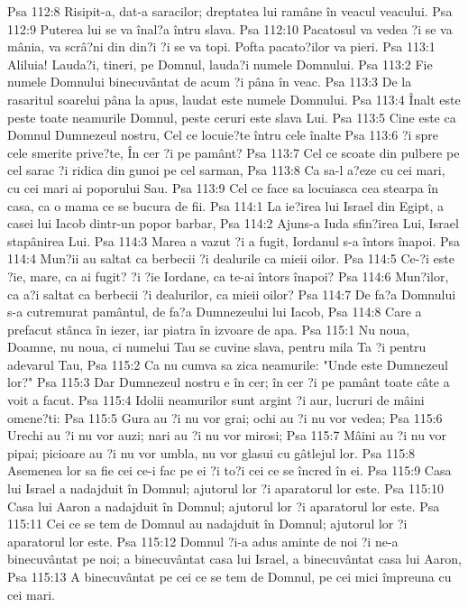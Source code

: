 Psa 112:8  Risipit-a, dat-a saracilor; dreptatea lui ramâne în veacul veacului.
Psa 112:9  Puterea lui se va înal?a întru slava.
Psa 112:10  Pacatosul va vedea ?i se va mânia, va scrâ?ni din din?i ?i se va topi. Pofta pacato?ilor va pieri.
Psa 113:1  Aliluia! Lauda?i, tineri, pe Domnul, lauda?i numele Domnului.
Psa 113:2  Fie numele Domnului binecuvântat de acum ?i pâna în veac.
Psa 113:3  De la rasaritul soarelui pâna la apus, laudat este numele Domnului.
Psa 113:4  Înalt este peste toate neamurile Domnul, peste ceruri este slava Lui.
Psa 113:5  Cine este ca Domnul Dumnezeul nostru, Cel ce locuie?te întru cele înalte
Psa 113:6  ?i spre cele smerite prive?te, În cer ?i pe pamânt?
Psa 113:7  Cel ce scoate din pulbere pe cel sarac ?i ridica din gunoi pe cel sarman,
Psa 113:8  Ca sa-l a?eze cu cei mari, cu cei mari ai poporului Sau.
Psa 113:9  Cel ce face sa locuiasca cea stearpa în casa, ca o mama ce se bucura de fii.
Psa 114:1  La ie?irea lui Israel din Egipt, a casei lui Iacob dintr-un popor barbar,
Psa 114:2  Ajuns-a Iuda sfin?irea Lui, Israel stapânirea Lui.
Psa 114:3  Marea a vazut ?i a fugit, Iordanul s-a întors înapoi.
Psa 114:4  Mun?ii au saltat ca berbecii ?i dealurile ca mieii oilor.
Psa 114:5  Ce-?i este ?ie, mare, ca ai fugit? ?i ?ie Iordane, ca te-ai întors înapoi?
Psa 114:6  Mun?ilor, ca a?i saltat ca berbecii ?i dealurilor, ca mieii oilor?
Psa 114:7  De fa?a Domnului s-a cutremurat pamântul, de fa?a Dumnezeului lui Iacob,
Psa 114:8  Care a prefacut stânca în iezer, iar piatra în izvoare de apa.
Psa 115:1  Nu noua, Doamne, nu noua, ci numelui Tau se cuvine slava, pentru mila Ta ?i pentru adevarul Tau,
Psa 115:2  Ca nu cumva sa zica neamurile: "Unde este Dumnezeul lor?"
Psa 115:3  Dar Dumnezeul nostru e în cer; în cer ?i pe pamânt toate câte a voit a facut.
Psa 115:4  Idolii neamurilor sunt argint ?i aur, lucruri de mâini omene?ti:
Psa 115:5  Gura au ?i nu vor grai; ochi au ?i nu vor vedea;
Psa 115:6  Urechi au ?i nu vor auzi; nari au ?i nu vor mirosi;
Psa 115:7  Mâini au ?i nu vor pipai; picioare au ?i nu vor umbla, nu vor glasui cu gâtlejul lor.
Psa 115:8  Asemenea lor sa fie cei ce-i fac pe ei ?i to?i cei ce se încred în ei.
Psa 115:9  Casa lui Israel a nadajduit în Domnul; ajutorul lor ?i aparatorul lor este.
Psa 115:10  Casa lui Aaron a nadajduit în Domnul; ajutorul lor ?i aparatorul lor este.
Psa 115:11  Cei ce se tem de Domnul au nadajduit în Domnul; ajutorul lor ?i aparatorul lor este.
Psa 115:12  Domnul ?i-a adus aminte de noi ?i ne-a binecuvântat pe noi; a binecuvântat casa lui Israel, a binecuvântat casa lui Aaron,
Psa 115:13  A binecuvântat pe cei ce se tem de Domnul, pe cei mici împreuna cu cei mari.
